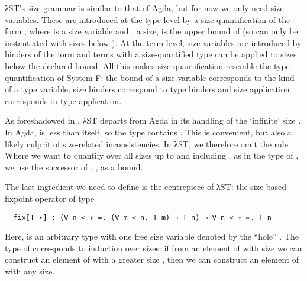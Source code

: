 λST's size grammar is similar to that of Agda, but for now we only need size
variables. These are introduced at the type level by a size quantification of
the form , where  is a size variable and , a
size, is the upper bound of  (so  can only be instantiated
with sizes below ). At the term level, size variables are introduced by
binders of the form  and terms with a size-quantified type can be
applied to sizes below the declared bound. All this makes size quantification
resemble the type quantification of System F: the bound of a size variable
corresponds to the kind of a type variable, size binders correspond to type
binders and size application corresponds to type application.

As foreshadowed in , λST departs from Agda in its
handling of the \enquote*{infinite} size . In Agda,  is less
than itself, so the type  contains . This is convenient,
but also a likely culprit of size-related inconsistencies. In λST, we therefore
omit the rule . Where we want to quantify over all sizes up to and
including , as in the type of , we use the successor of
, , as a bound.

The last ingredient we need to define  is the centrepiece of λST:
the size-based fixpoint operator  of type
\begin{verbatim}
  fix[T ∙] : (∀ n < ↑ ∞. (∀ m < n. T m) → T n) → ∀ n < ↑ ∞. T n
\end{verbatim}
Here,  is an arbitrary type with one free size variable denoted by the
\enquote{hole} . The type of  corresponds to induction over
sizes: if from an element of  with size  we can construct an
element of  with a greater size , then we can construct an
element of  with any size.

